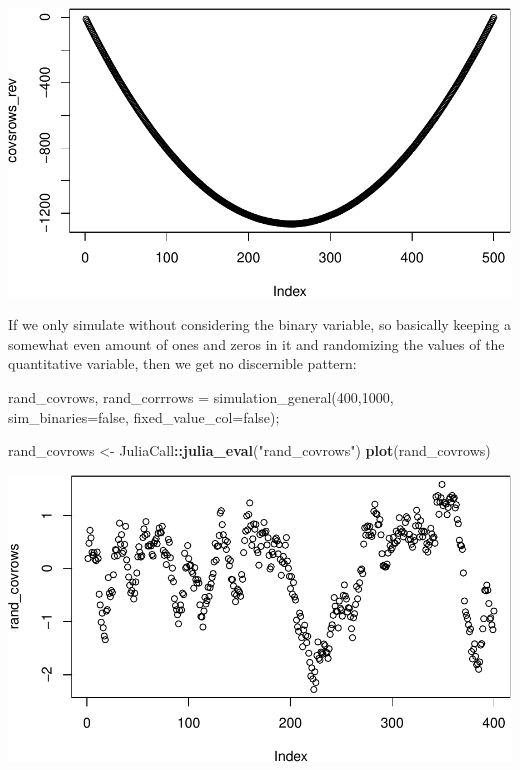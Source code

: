 \documentclass[]{article}
\newenvironment{Shaded}{\begin{snugshade}}{\end{snugshade}}
\newcommand{\FloatTok}[1]{\textcolor[rgb]{0.00,0.00,0.81}{#1}}
\newcommand{\KeywordTok}[1]{\textcolor[rgb]{0.13,0.29,0.53}{\textbf{#1}}}
\newcommand{\NormalTok}[1]{#1}
\newcommand{\OperatorTok}[1]{\textcolor[rgb]{0.81,0.36,0.00}{\textbf{#1}}}
\newcommand{\StringTok}[1]{\textcolor[rgb]{0.31,0.60,0.02}{#1}}
\begin{document}
\includegraphics{./figures/unnamed-chunk-13-1.pdf}

If we only simulate without considering the binary variable, so
basically keeping a somewhat even amount of ones and zeros in it and
randomizing the values of the quantitative variable, then we get no
discernible pattern:

\begin{Shaded}
\begin{Highlighting}[]
\NormalTok{rand_covrows, rand_corrrows = simulation_general(}\FloatTok{400}\NormalTok{,}\FloatTok{1000}\NormalTok{, }
\NormalTok{                                        sim_binaries=false, fixed_value_col=false);}
\end{Highlighting}
\end{Shaded}

\begin{Shaded}
\begin{Highlighting}[]
\NormalTok{rand_covrows <-}\StringTok{ }\NormalTok{JuliaCall}\OperatorTok{::}\KeywordTok{julia_eval}\NormalTok{(}\StringTok{"rand_covrows"}\NormalTok{)}
\KeywordTok{plot}\NormalTok{(rand_covrows)}
\end{Highlighting}
\end{Shaded}

\includegraphics{./figures/unnamed-chunk-15-1.pdf}
\end{document}
